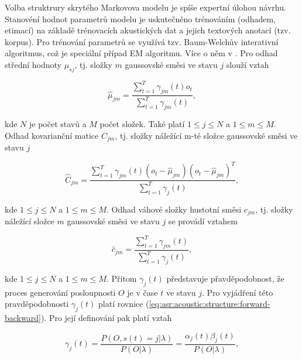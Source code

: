 Volba struktrury skrytého Markovova modelu je spíše expertní úlohou návrhu. Stanovéní hodnot parametrů modelu je uskutečněno trénováním (odhadem, etimací) na základě trénovacích akustických dat a jejich textových anotací (tzv. korpus). Pro trénování parametrů se využívá tzv. Baum-Welchův interativní algoritmus, což je speciální případ EM algoritmu. Více o něm v \cite{Holmes2001}. Pro odhad střední hodnoty $\mu_{sj}$, tj. složky $m$ gaussovské směsi ve stavu $j$ slouží vztah

\begin{equation}
  \hat{\mu}_{jm} = \frac{\sum_{t=1}^{T}\gamma_{jm}\left(t\right)o_t}{\sum_{t=1}^{T}\gamma_{jm}\left(t\right)},
  \label{eq:asr:acoustic:structure:mu}
\end{equation}

\noindent kde $N$ je počet stavů a $M$ počet složek. Také platí $1 \leq j \leq N$ a $1 \leq m \leq M$. Odhad kovarianční matice $C_{jm}$, tj. složky náležící m-té složce gaussovské směsi ve stavu $j$

\begin{equation}
  \hat{C}_{jm} = \frac{\sum_{t=1}^{T} \gamma_{jm}\left(t\right)\left(o_t - \hat{\mu}_{jm}\right)\left(o_t - \hat{\mu}_{jm}\right)^{T}}{\sum_{t=1}^{T}\gamma_j\left(t\right)},
  \label{eq:asr:acoustic:structure:covariant}
\end{equation}

\noindent kde $1 \leq j \leq N$ a $1 \leq m \leq M$. Odhad váhové složky hustotní směsi $c_{jm}$, tj. složky náležící složce $m$ gaussovské směsi ve stavu $j$ se provádí vztahem

\begin{equation}
  \hat{c}_{jm} = \frac{\sum_{t=1}^{T} \gamma_{jm}\left(t\right)}{\sum_{t=1}^{T}\gamma_j\left(t\right)},
  \label{eq:asr:acoustic:structure:weight}
\end{equation}

\noindent kde $1 \leq j \leq N$ a $1 \leq m \leq M$. Přitom $\gamma_{j}\left(t\right)$ představuje přavděpodobnost, že proces generování posloupnosti $O$ je v čase $t$ ve stavu $j$. Pro vyjádření této pravděpodobnosti $\gamma_{j}\left(t\right)$ platí rovnice (\ref{eq:asr:acoustic:structure:forward-backward}). Pro její definování pak platí vztah

\begin{equation}
 \gamma_{j}\left(t\right) = \frac{P\left(O, s\left(t\right)=j|\lambda\right)}{P\left(O|\lambda\right)} = \frac{\alpha_{j}\left(t\right)\beta_{j}\left(t\right)}{P\left(O|\lambda\right)} ,
  \label{eq:asr:acoustic:structure:gamma}
\end{equation}

